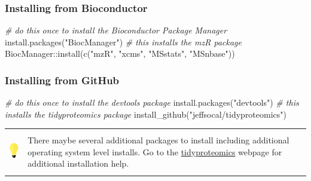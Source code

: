 \documentclass[
]{book}
\newenvironment{Shaded}{\begin{snugshade}}{\end{snugshade}}
\newcommand{\CommentTok}[1]{\textcolor[rgb]{0.56,0.35,0.01}{\textit{#1}}}
\newcommand{\FunctionTok}[1]{\textcolor[rgb]{0.00,0.00,0.00}{#1}}
\newcommand{\NormalTok}[1]{#1}
\newcommand{\SpecialCharTok}[1]{\textcolor[rgb]{0.00,0.00,0.00}{#1}}
\newcommand{\StringTok}[1]{\textcolor[rgb]{0.31,0.60,0.02}{#1}}
\begin{document}
\hypertarget{installing-from-bioconductor}{%
\subsubsection*{Installing from Bioconductor}\label{installing-from-bioconductor}}

\begin{Shaded}
\begin{Highlighting}[]
\CommentTok{\# do this once to install the Bioconductor Package Manager}
\FunctionTok{install.packages}\NormalTok{(}\StringTok{"BiocManager"}\NormalTok{)}
\CommentTok{\# this installs the mzR package}
\NormalTok{BiocManager}\SpecialCharTok{::}\FunctionTok{install}\NormalTok{(}\FunctionTok{c}\NormalTok{(}\StringTok{"mzR"}\NormalTok{, }\StringTok{"xcms"}\NormalTok{, }\StringTok{"MSstats"}\NormalTok{, }\StringTok{"MSnbase"}\NormalTok{))}
\end{Highlighting}
\end{Shaded}

\hypertarget{installing-from-github}{%
\subsubsection*{Installing from GitHub}\label{installing-from-github}}

\begin{Shaded}
\begin{Highlighting}[]
\CommentTok{\# do this once to install the devtools package }
\FunctionTok{install.packages}\NormalTok{(}\StringTok{"devtools"}\NormalTok{)}
\CommentTok{\# this installs the tidyproteomics package}
\FunctionTok{install\_github}\NormalTok{(}\StringTok{"jeffsocal/tidyproteomics"}\NormalTok{)}
\end{Highlighting}
\end{Shaded}

\hfill\break

\begin{longtable}[]{@{}
  >{\raggedright\arraybackslash}p{}
  >{\raggedright\arraybackslash}p{}@{}}
\toprule\noalign{}
\endhead
\bottomrule\noalign{}
\endlastfoot
\includegraphics[width=\textwidth,height=0.70833in]{images/01.png} & There maybe several additional packages to install including additional operating system level installs. Go to the \href{https://jeffsocal.github.io/tidyproteomics/}{tidyproteomics} webpage for additional installation help. \textbar{} \\
\end{longtable}
\end{document}
